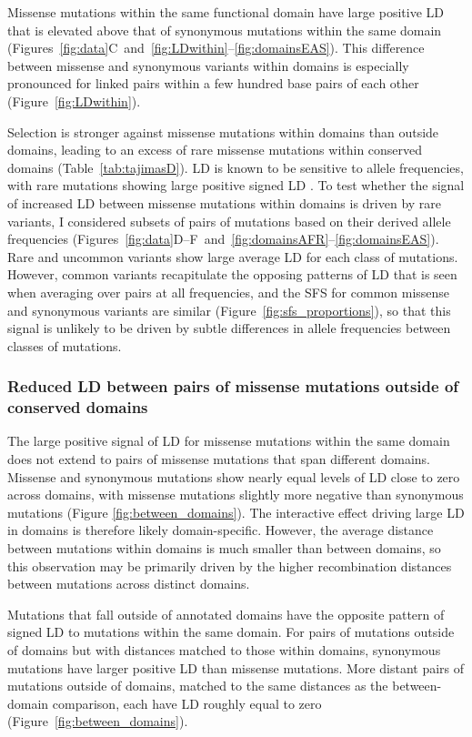 \documentclass[]{article}
\begin{document}
Missense mutations within the same functional domain have large positive LD
that is elevated above that of synonymous mutations within the same domain
(Figures~\ref{fig:data}C~and~\ref{fig:LDwithin}--\ref{fig:domainsEAS}). This
difference between missense and synonymous variants within domains is
especially pronounced for linked pairs within a few hundred base pairs of each
other (Figure~\ref{fig:LDwithin}).

Selection is stronger against missense mutations within domains than outside
domains, leading to an excess of rare missense mutations within conserved
domains (Table~\ref{tab:tajimasD}). LD is known to be sensitive to allele
frequencies, with rare mutations showing large positive signed LD
\citep{Good2022-ot}. To test whether the signal of increased LD between
missense mutations within domains is driven by rare variants, I considered
subsets of pairs of mutations based on their derived allele frequencies
(Figures~\ref{fig:data}D--F~and~\ref{fig:domainsAFR}--\ref{fig:domainsEAS}).
Rare and uncommon variants show large average LD for each class of mutations.
However, common variants recapitulate the opposing patterns of LD that is seen
when averaging over pairs at all frequencies, and the SFS for common missense
and synonymous variants are similar (Figure~\ref{fig:sfs_proportions}), so that
this signal is unlikely to be driven by subtle differences in allele
frequencies between classes of mutations.

\subsubsection{Reduced LD between pairs of missense mutations outside of conserved domains}

The large positive signal of LD for missense mutations within the same domain
does not extend to pairs of missense mutations that span different domains.
Missense and synonymous mutations show nearly equal levels of LD close
to zero across domains, with missense mutations slightly more negative than
synonymous mutations (Figure \ref{fig:between_domains}). The interactive effect
driving large LD in domains is therefore likely domain-specific. However, the
average distance between mutations within domains is much smaller than
between domains, so this observation may be primarily driven by the higher
recombination distances between mutations across distinct domains.

Mutations that fall outside of annotated domains have the
opposite pattern of signed LD to mutations within the same
domain. For pairs of mutations outside of domains but with distances matched to
those within domains, synonymous mutations have larger positive LD
than missense mutations. More distant pairs of mutations outside of domains,
matched to the same distances as the between-domain comparison, each have LD
roughly equal to zero (Figure~\ref{fig:between_domains}).
\end{document}
